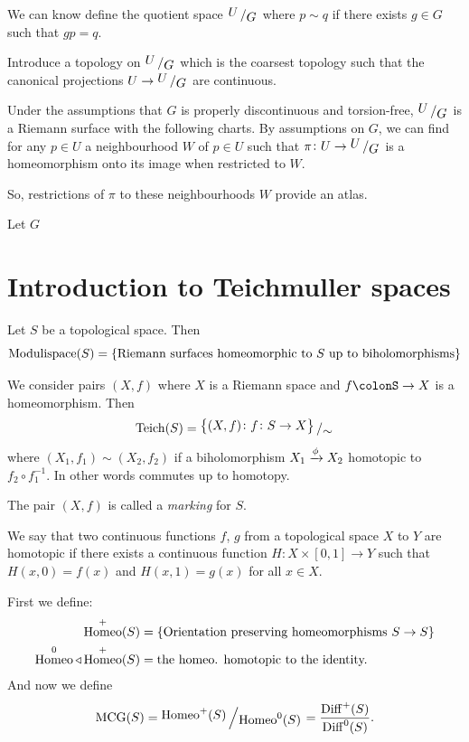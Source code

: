 \documentclass[11pt,a4paper]{article}
\DeclareMathOperator{\Homeo}{Homeo}
\DeclareMathOperator{\Diff}{Diff}
\DeclareMathOperator{\MCG}{MCG}
\begin{document}
We can know define the quotient space $\bigslant{U}{G}$ where
$p \sim q$ if there exists $g \in G$ such that $gp = q$.

Introduce a topology on $\bigslant{U}{G}$ which is the coarsest topology
such that the canonical projections $U \to \bigslant{U}{G}$ are continuous.

Under the assumptions that $G$ is properly discontinuous and torsion-free,
$\bigslant{U}{G}$ is a Riemann surface with the following charts.
By assumptions on $G$, we can find for any $p \in U$ a neighbourhood $W$ of
$p \in U$ such that $\pi \colon U \to \bigslant{U}{G}$ is a homeomorphism
onto its image when restricted to $W$.

So, restrictions of $\pi$ to these neighbourhoods $W$ provide an atlas.

\begin{definition}
  Let $G$
\end{definition}

\newpage

\section{Introduction to Teichmuller spaces}
Let $S$ be a topological space.
Then
\[
  \mathrm{Modulispace}(S) = 
  \set{\text{Riemann surfaces homeomorphic to $S$ up to biholomorphisms}}
\]
\begin{definition}
  We consider pairs $(X,f)$ where $X$ is a Riemann space and
  $f \colonS \to X$ is a homeomorphism.
  Then
  \[
    \mathrm{Teich}(S) = 
    \bigslant{\set{(X,f) \colon f \colon S \to X}}{\sim}
  \]
  where $(X_1,f_1) \sim (X_2,f_2)$ if a biholomorphism $X_1 \xrightarrow{\phi} X_2$
  homotopic to $f_2 \circ f_1^{-1}$.
  In other words
  commutes up to homotopy.
\end{definition}

\begin{remark}
  The pair $(X,f)$ is called a \emph{marking} for $S$.
\end{remark}

\begin{definition}[Homotopy]
  We say that two continuous functions $f$, $g$ from a topological space $X$
  to $Y$ are homotopic if there exists a continuous function 
  $H \colon X \times [0,1] \to Y$ such that $H(x,0) = f(x)$ and
  $H(x,1) = g(x)$ for all $x \in X$.
\end{definition}

\begin{definition}
  First we define:
  \begin{align*}
    \Homeo^+(S) &= \set{\text{Orientation preserving homeomorphisms
    $S \to S$}} \\
    \Homeo^0 \triangleleft \Homeo^+(S) &= \text{the homeo. homotopic to the
    identity.}
  \end{align*}
  And now we define
  \[
    \MCG(S) = \bigslant{\Homeo^+(S)}{\Homeo^0(S)} =
    \frac{\Diff^+(S)}{\Diff^0(S)}.
  \]
\end{definition}
\end{document}
